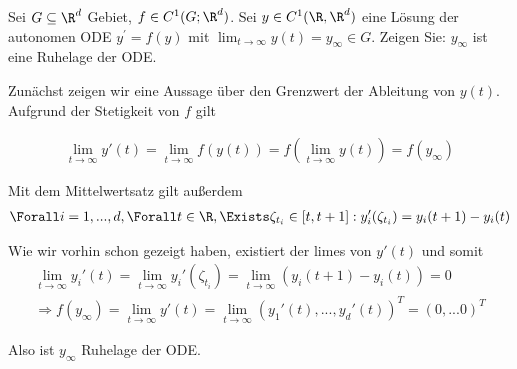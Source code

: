 \begin{exercise}
Sei $G \subseteq \R^d$ Gebiet, $f \in C^1(G;\R^d)$. Sei $y \in C^1(\R,\R^d)$
eine Lösung der autonomen ODE $y^{\prime} = f(y)$ mit
$\lim_{t \rightarrow \infty} y(t) = y_{\infty} \in G$.
Zeigen Sie: $y_{\infty}$ ist eine Ruhelage der ODE.
\end{exercise}
\begin{solution}
Zunächst zeigen wir eine Aussage über den Grenzwert der Ableitung von $y(t)$. Aufgrund der Stetigkeit von $f$ gilt

\begin{align*}
  \lim_{t \to \infty} y'(t) = \lim_{t \to \infty} f(y(t)) = f(\lim_{t \to \infty} y(t)) = f(y_{\infty})
\end{align*}

Mit dem Mittelwertsatz gilt außerdem
\begin{align*}
  \Forall i = 1,...,d, \Forall t \in \R, \Exists \zeta_{t_i} \in [t,t+1]: y_i '(\zeta_{t_i}) = y_i(t+1)-y_i(t)
\end{align*}

Wie wir vorhin schon gezeigt haben, existiert der limes von $y'(t)$ und somit
\begin{align*}
  \lim_{t \to \infty} y_i'(t) = \lim_{t \to \infty} y_i'(\zeta_{t_i}) = \lim_{t \to \infty} (y_i(t+1)-y_i(t)) = 0 \\
  \Rightarrow f(y_\infty) = \lim_{t \to \infty} y'(t) = \lim_{t \to \infty} (y_1'(t),...,y_d'(t))^{T} = (0,...0)^T
\end{align*}

Also ist $y_{\infty}$ Ruhelage der ODE.
\end{solution}
